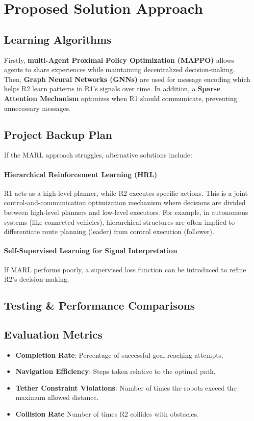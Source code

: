 \documentclass[a4paper,11pt]{article}
\begin{document}
\section{Proposed Solution Approach}
\subsection{Learning Algorithms}

Firstly, \textbf{multi-Agent Proximal Policy Optimization (MAPPO)} \cite{NeurIPS2021} allows agents to share experiences while maintaining decentralized decision-making. Then, \textbf{Graph Neural Networks (GNNs)} \cite{lowe2020multiagent} are used for message encoding which helps R2 learn patterns in R1’s signals over time. In addition, a \textbf{Sparse Attention Mechanism} \cite{das2019tarmac} optimizes when R1 should communicate, preventing unnecessary messages.

\subsection{Project Backup Plan} 
If the MARL approach struggles, alternative solutions include:
\paragraph{Hierarchical Reinforcement Learning (HRL)} R1 acts as a high-level planner, while R2 executes specific actions. This is a joint control-and-communication optimization mechanism where decisions are divided between high-level planners and low-level executors. \cite{deepRL-joint-trajectory-communication-IoT} For example, in autonomous systems (like connected vehicles), hierarchical structures are often implied to differentiate route planning (leader) from control execution (follower).

\paragraph{Self-Supervised Learning for Signal Interpretation} If MARL performs poorly, a supervised loss function can be introduced to refine R2’s decision-making. 

\subsection{Testing \& Performance Comparisons}
\subsection{Evaluation Metrics} 
\begin{itemize}
    \item \textbf{Completion Rate}: Percentage of successful goal-reaching attempts.
    \item \textbf{Navigation Efficiency}: Steps taken relative to the optimal path.
    \item \textbf{Tether Constraint Violations}: Number of times the robots exceed the maximum allowed distance.
    \item \textbf{Collision Rate} Number of times R2 collides with obstacles.
\end{itemize}
\end{document}
